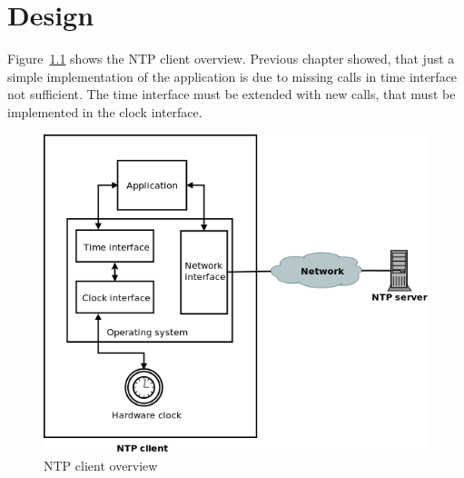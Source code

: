 
\chapter{Design}
Figure~\ref{fig:design-overview} shows the NTP client overview.
Previous chapter showed, that just a simple implementation of the application
is due to missing calls in time interface not sufficient.
The time interface must be extended with new calls,
that must be implemented in the clock interface.

\begin{figure}[H]
  \centering
  \includegraphics[width=13cm,keepaspectratio]{fig/design.png}
  \caption{NTP client overview} %
  \label{fig:design-overview} %
\end{figure}










%
